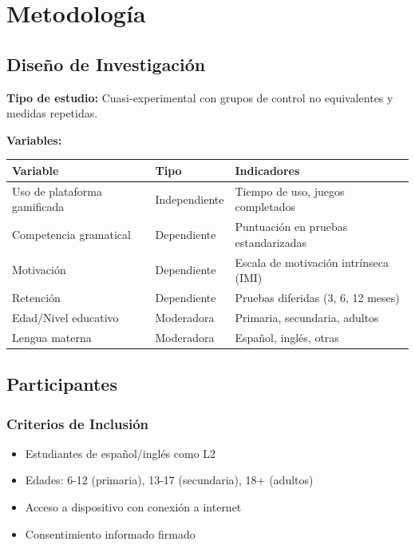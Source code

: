 \documentclass[12pt,a4paper]{article}
\begin{document}
\section{Metodología}

\subsection{Diseño de Investigación}

\textbf{Tipo de estudio:} Cuasi-experimental con grupos de control no equivalentes y medidas repetidas.

\textbf{Variables:}

\begin{table}[H]
\centering
\begin{tabular}{|l|l|l|}
\hline
\textbf{Variable} & \textbf{Tipo} & \textbf{Indicadores} \\
\hline
Uso de plataforma gamificada & Independiente & Tiempo de uso, juegos completados \\
\hline
Competencia gramatical & Dependiente & Puntuación en pruebas estandarizadas \\
\hline
Motivación & Dependiente & Escala de motivación intrínseca (IMI) \\
\hline
Retención & Dependiente & Pruebas diferidas (3, 6, 12 meses) \\
\hline
Edad/Nivel educativo & Moderadora & Primaria, secundaria, adultos \\
\hline
Lengua materna & Moderadora & Español, inglés, otras \\
\hline
\end{tabular}
\end{table}

\subsection{Participantes}

\subsubsection{Criterios de Inclusión}

\begin{itemize}
    \item Estudiantes de español/inglés como L2
    \item Edades: 6-12 (primaria), 13-17 (secundaria), 18+ (adultos)
    \item Acceso a dispositivo con conexión a internet
    \item Consentimiento informado firmado
\end{itemize}
\end{document}
